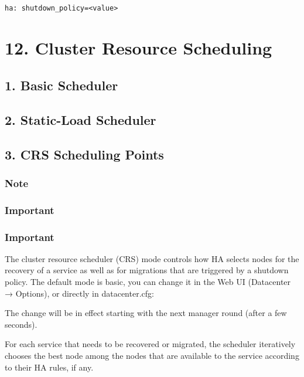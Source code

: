 \begin{lstlisting}

ha: shutdown_policy=<value>

\end{lstlisting}


\section{12. Cluster Resource Scheduling}

\subsection{1. Basic Scheduler}

\subsection{2. Static-Load Scheduler}

\subsection{3. CRS Scheduling Points}

\subsubsection{Note}

\subsubsection{Important}

\subsubsection{Important}

The cluster resource scheduler (CRS) mode controls how HA selects nodes for the recovery of a service as well as for migrations that are triggered by a shutdown policy. The default mode is basic, you can change it in the Web UI (Datacenter → Options), or directly in datacenter.cfg:

The change will be in effect starting with the next manager round (after a few seconds).

For each service that needs to be recovered or migrated, the scheduler iteratively chooses the best node among the nodes that are available to the service according to their HA rules, if any.

